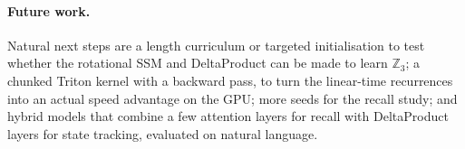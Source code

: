 \paragraph{Future work.} Natural next steps are a length curriculum or targeted initialisation to test whether
the rotational SSM and DeltaProduct can be made to learn $\mathbb{Z}_3$; a chunked Triton kernel with a backward
pass, to turn the linear-time recurrences into an actual speed advantage on the GPU; more seeds for the recall
study; and hybrid models that combine a few attention layers for recall with DeltaProduct layers for state
tracking, evaluated on natural language.
